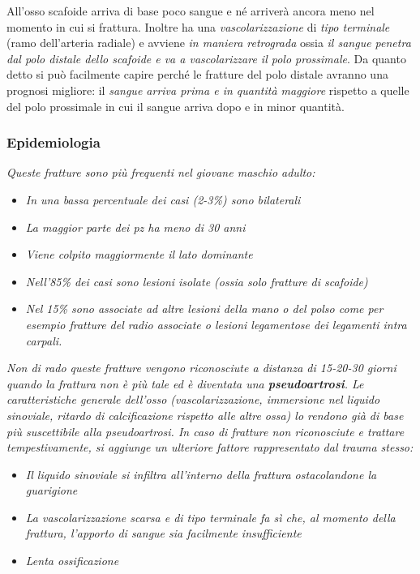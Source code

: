 All'osso scafoide arriva di base poco sangue e né arriverà ancora meno nel momento in cui si frattura. Inoltre ha una \emph{vascolarizzazione} di \emph{tipo terminale} (ramo dell'arteria radiale) e avviene \emph{in maniera retrograda} ossia \emph{il sangue penetra dal polo distale dello scafoide e va a vascolarizzare il polo prossimale}. Da quanto detto si
può facilmente capire perché le fratture del polo distale avranno una prognosi migliore: il \emph{sangue arriva prima e in quantità maggiore} rispetto a quelle del polo prossimale in cui il sangue arriva dopo e in
minor quantità.

\subsubsection{Epidemiologia}

\emph{Queste fratture sono più frequenti nel giovane maschio adulto:}

\begin{itemize}
\item
  \emph{In una bassa percentuale dei casi (2-3\%) sono bilaterali}
\item
  \emph{La maggior parte dei pz ha meno di 30 anni}
\item
  \emph{Viene colpito maggiormente il lato dominante}
\item
  \emph{Nell'85\% dei casi sono lesioni isolate (ossia solo fratture di scafoide)}
\item
  \emph{Nel 15\% sono associate ad altre lesioni della mano o del polso come per esempio fratture del radio associate o lesioni legamentose dei legamenti intra carpali.}
\end{itemize}

\emph{Non di rado queste fratture vengono riconosciute a distanza di 15-20-30 giorni quando la frattura non è più tale ed è diventata una \textbf{\emph{pseudoartrosi}}. Le caratteristiche generale dell'osso (vascolarizzazione, immersione nel liquido sinoviale, ritardo di calcificazione rispetto alle altre ossa) lo rendono già di base più suscettibile alla pseudoartrosi. In caso di fratture non riconosciute e trattare tempestivamente, si aggiunge un ulteriore fattore rappresentato dal trauma stesso:}

\begin{itemize}
\item
  \emph{Il liquido sinoviale si infiltra all'interno della frattura ostacolandone la guarigione}
\item
  \emph{La vascolarizzazione scarsa e di tipo terminale fa sì che, al momento della frattura, l'apporto di sangue sia facilmente insufficiente}
\item
  \emph{Lenta ossificazione}
\end{itemize}



